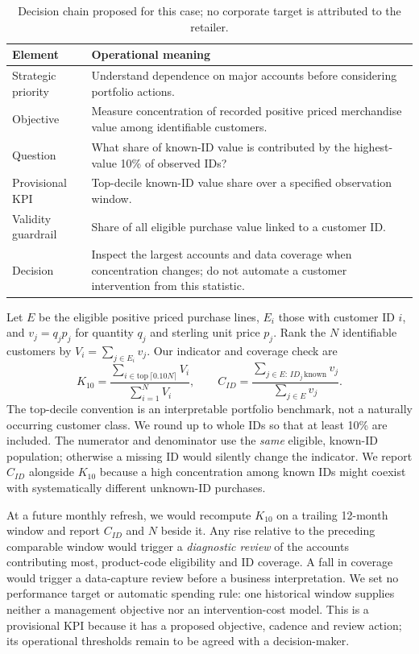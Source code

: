 \documentclass[10pt,a4paper]{article}
\newcommand{\subhead}[1]{\vspace{0.15em}{\bfseries #1}\par}
\begin{document}
\begin{table}[H]\centering\small
\caption{Decision chain proposed for this case; no corporate target is attributed to the retailer.}
\begin{tabularx}{\linewidth}{@{}>{\raggedright\arraybackslash}p{2.45cm}X@{}}\toprule
Element & Operational meaning \\\midrule
Strategic priority & Understand dependence on major accounts before considering portfolio actions. \\
Objective & Measure concentration of recorded positive priced merchandise value among identifiable customers. \\
Question & What share of known-ID value is contributed by the highest-value 10\% of observed IDs? \\
Provisional KPI & Top-decile known-ID value share over a specified observation window. \\
Validity guardrail & Share of all eligible purchase value linked to a customer ID. \\
Decision & Inspect the largest accounts and data coverage when concentration changes; do not automate a customer intervention from this statistic. \\
\bottomrule\end{tabularx}
\end{table}

Let $E$ be the eligible positive priced purchase lines, $E_i$ those with customer ID $i$, and $v_j=q_jp_j$ for quantity $q_j$ and sterling unit price $p_j$. Rank the $N$ identifiable customers by $V_i=\sum_{j\in E_i}v_j$. Our indicator and coverage check are
\[
K_{10}=\frac{\sum_{i\in\mathrm{top}\,\lceil 0.10N\rceil}V_i}{\sum_{i=1}^{N}V_i},
\qquad
C_{ID}=\frac{\sum_{j\in E:\,ID_j\,\mathrm{known}}v_j}{\sum_{j\in E}v_j}.
\]
The top-decile convention is an interpretable portfolio benchmark, not a naturally occurring customer class. We round up to whole IDs so that at least 10\% are included. The numerator and denominator use the \emph{same} eligible, known-ID population; otherwise a missing ID would silently change the indicator. We report $C_{ID}$ alongside $K_{10}$ because a high concentration among known IDs might coexist with systematically different unknown-ID purchases.

\subhead{Review rule and target status}
At a future monthly refresh, we would recompute $K_{10}$ on a trailing 12-month window and report $C_{ID}$ and $N$ beside it. Any rise relative to the preceding comparable window would trigger a \emph{diagnostic review} of the accounts contributing most, product-code eligibility and ID coverage. A fall in coverage would trigger a data-capture review before a business interpretation. We set no performance target or automatic spending rule: one historical window supplies neither a management objective nor an intervention-cost model. This is a provisional KPI because it has a proposed objective, cadence and review action; its operational thresholds remain to be agreed with a decision-maker.
\end{document}
